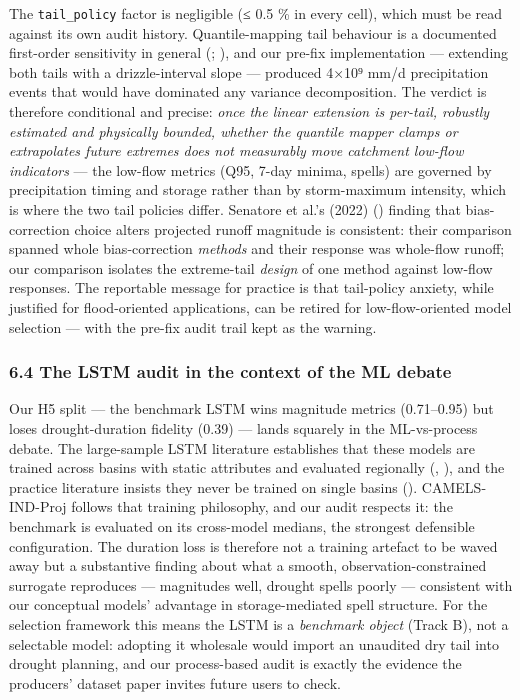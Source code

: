 \documentclass[
  english,
  11pt,
]{article}
\begin{document}
The \texttt{tail\_policy} factor is negligible (≤ 0.5 \% in every cell),
which must be read against its own audit history. Quantile-mapping tail
behaviour is a documented first-order sensitivity in general
(;
), and our pre-fix
implementation --- extending both tails with a drizzle-interval slope
--- produced 4×10⁹ mm/d precipitation events that would have dominated
any variance decomposition. The verdict is therefore conditional and
precise: \emph{once the linear extension is per-tail, robustly estimated
and physically bounded, whether the quantile mapper clamps or
extrapolates future extremes does not measurably move catchment low-flow
indicators} --- the low-flow metrics (Q95, 7-day minima, spells) are
governed by precipitation timing and storage rather than by
storm-maximum intensity, which is where the two tail policies differ.
Senatore et al.'s (2022) () finding that bias-correction choice alters projected runoff
magnitude is consistent: their comparison spanned whole bias-correction
\emph{methods} and their response was whole-flow runoff; our comparison
isolates the extreme-tail \emph{design} of one method against low-flow
responses. The reportable message for practice is that tail-policy
anxiety, while justified for flood-oriented applications, can be retired
for low-flow-oriented model selection --- with the pre-fix audit trail
kept as the warning.

\subsubsection{6.4 The LSTM audit in the context of the ML
debate}\label{the-lstm-audit-in-the-context-of-the-ml-debate}

Our H5 split --- the benchmark LSTM wins magnitude metrics (0.71--0.95)
but loses drought-duration fidelity (0.39) --- lands squarely in the
ML-vs-process debate. The large-sample LSTM literature establishes that
these models are trained across basins with static attributes and
evaluated regionally (, ), and the practice
literature insists they never be trained on single basins
().
CAMELS-IND-Proj follows that training philosophy, and our audit respects
it: the benchmark is evaluated on its cross-model medians, the strongest
defensible configuration. The duration loss is therefore not a training
artefact to be waved away but a substantive finding about what a smooth,
observation-constrained surrogate reproduces --- magnitudes well,
drought spells poorly --- consistent with our conceptual models'
advantage in storage-mediated spell structure. For the selection
framework this means the LSTM is a \emph{benchmark object} (Track B),
not a selectable model: adopting it wholesale would import an unaudited
dry tail into drought planning, and our process-based audit is exactly
the evidence the producers' dataset paper invites future users to check.
\end{document}
